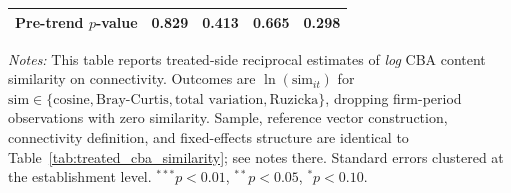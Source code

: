 \begin{table}[H]
\begin{tabular}{lcccc}
Pre-trend $p$-value & 0.829 & 0.413 & 0.665 & 0.298 \\
\bottomrule
\end{tabular}
\begin{minipage}{\linewidth}
\footnotesize\vspace{4pt}
\textit{Notes:} This table reports treated-side reciprocal estimates of \emph{log} CBA content similarity on connectivity. Outcomes are $\ln(\text{sim}_{it})$ for $\text{sim} \in \{\text{cosine}, \text{Bray-Curtis}, \text{total variation}, \text{Ruzicka}\}$, dropping firm-period observations with zero similarity. Sample, reference vector construction, connectivity definition, and fixed-effects structure are identical to Table~\ref{tab:treated_cba_similarity}; see notes there. Standard errors clustered at the establishment level. $^{***}p<0.01$, $^{**}p<0.05$, $^{*}p<0.10$.
\end{minipage}
\end{table}
